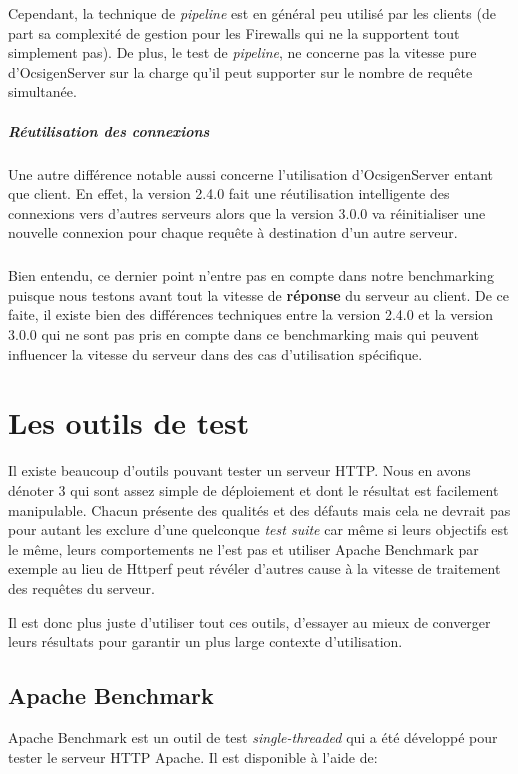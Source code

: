\documentclass[a4paper, 11pt]{article}
\begin{document}
Cependant,  la technique de  \emph{pipeline} est en général peu  utilisé par les
clients  (de  part  sa  complexité de  gestion  pour  les  Firewalls  qui  ne la
supportent  tout simplement  pas).  De  plus,  le  test  de \emph{pipeline},  ne
concerne pas la vitesse pure d'OcsigenServer  sur la charge qu'il peut supporter
sur le nombre de requête simultanée.

\subparagraph{Réutilisation des connexions}
Une  autre  différence  notable  aussi  concerne  l'utilisation  d'OcsigenServer
entant  que  client.   En  effet,   la  version  2.4.0  fait  une  réutilisation
intelligente des  connexions vers d'autres  serveurs alors que  la version 3.0.0
va réinitialiser une  nouvelle connexion pour chaque requête  à destination d'un
autre serveur.

\subparagraph{}
Bien entendu,  ce  dernier point n'entre  pas en compte  dans notre benchmarking
puisque nous  testons avant tout la  vitesse de  \textbf{réponse} du  serveur au
client.  De ce faite, il existe bien des différences techniques entre la version
2.4.0 et la  version 3.0.0 qui ne  sont pas pris en compte  dans ce benchmarking
mais qui  peuvent influencer la vitesse  du serveur  dans des  cas d'utilisation
spécifique.

\section{Les outils de test}

Il existe beaucoup  d'outils  pouvant  tester  un  serveur  HTTP.  Nous en avons
dénoter  3  qui  sont  assez simple  de  déploiement  et  dont  le  résultat est
facilement manipulable.  Chacun présente  des qualités et des  défauts mais cela
ne devrait  pas pour autant les  exclure d'une quelconque  \emph{test suite} car
même si leurs  objectifs  est  le  même,  leurs  comportements  ne  l'est pas et
utiliser Apache Benchmark  par exemple au lieu de  Httperf peut révéler d'autres
cause à la vitesse de traitement des requêtes du serveur.

Il est donc  plus  juste  d'utiliser  tout  ces  outils,  d'essayer  au mieux de
converger leurs résultats pour garantir un plus large contexte d'utilisation.

\subsection{Apache Benchmark}

Apache  Benchmark  est  un  outil  de  test  \emph{single-threaded}  qui  a  été
développé pour tester le serveur HTTP Apache. Il est disponible à l'aide de:
\end{document}

